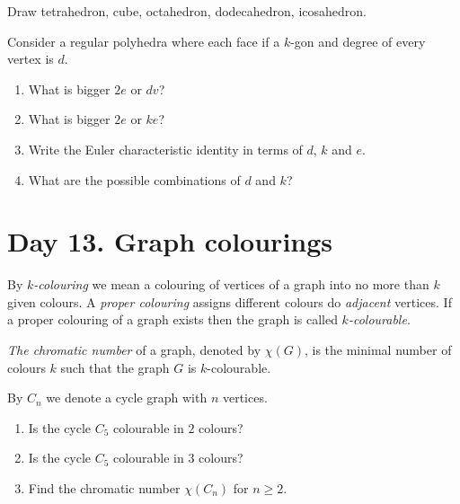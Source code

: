 \documentclass[12pt]{article}
\begin{document}
\begin{exercise}
    Draw tetrahedron, cube, octahedron, dodecahedron, icosahedron.
\end{exercise}

\begin{exercise}
    Consider a regular polyhedra where each face if a $k$-gon and degree of every vertex is $d$.
    \begin{enumerate}[label=\alph*]
        \item What is bigger $2e$ or $dv$?
        \item What is bigger $2e$ or $ke$?
        \item Write the Euler characteristic identity in terms of $d$, $k$ and $e$. 
        \item What are the possible combinations of $d$ and $k$?
    \end{enumerate}
\end{exercise}



\section{Day 13. Graph colourings}

\begin{definition}
    By \emph{$k$-colouring} we mean a colouring of vertices of a graph into no more than $k$ given colours.
    A \emph{proper colouring} assigns different colours do \emph{adjacent} vertices.
    If a proper colouring of a graph exists then the graph is called \emph{$k$-colourable}.
\end{definition}

\begin{definition}
    \emph{The chromatic number} of a graph, denoted by $\chi(G)$, is the minimal number of colours $k$ such that the graph $G$ is $k$-colourable.
\end{definition}

\begin{exercise}
    By $C_n$ we denote a cycle graph with $n$ vertices.

    \begin{enumerate}
        \item Is the cycle $C_5$ colourable in $2$ colours? 
        \item Is the cycle $C_5$ colourable in $3$ colours?
        \item Find the chromatic number $\chi(C_n)$ for $n\geq 2$.
    \end{enumerate}
\end{exercise}
\end{document}
